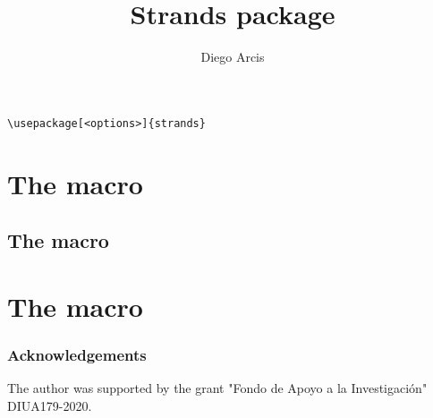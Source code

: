\documentclass[reqno]{../../../Projects/LaTeX/gtpart}
\title[Strands package]{Strands package}
\author[D. Arcis]{Diego Arcis}
\numberwithin{equation}{section}
\begin{document}
\maketitle

\begin{verbatim}
\usepackage[<options>]{strands}
\end{verbatim}

\section{The \texttt{\vpartition} macro}

\subsection{The \texttt{\arcpartition} macro}

\section{The \texttt{\strands} macro}

\subsubsection*{Acknowledgements}
The author was supported by the grant "Fondo de Apoyo a la Investigaci\'on" DIUA179-2020.



\end{document}
